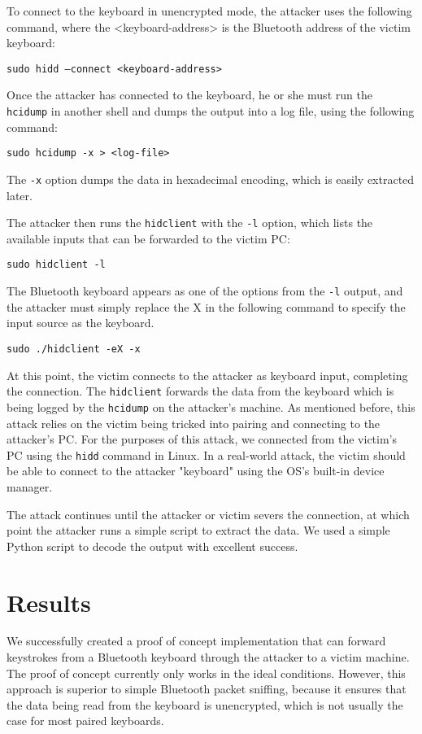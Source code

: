 \documentclass{acm_proc_article-sp}
\begin{document}
To connect to the keyboard in unencrypted mode, the attacker uses the following command, where the <keyboard-address> is the Bluetooth address of the victim keyboard:

\texttt{sudo hidd --connect <keyboard-address>}

Once the attacker has connected to the keyboard, he or she must run the \texttt{hcidump} in another shell and dumps the output into a log file, using the following command:

\texttt{sudo hcidump -x > <log-file>}

The \texttt{-x} option dumps the data in hexadecimal encoding, which is easily extracted later. 

The attacker then runs the \texttt{hidclient} with the \texttt{-l} option, which lists the available inputs that can be forwarded to the victim PC:

\texttt{sudo hidclient -l}

The Bluetooth keyboard appears as one of the options from the \texttt{-l} output, and the attacker must simply replace the X in the following command to specify the input source as the keyboard. 

\texttt{sudo ./hidclient -eX -x}

At this point, the victim connects to the attacker as keyboard input, completing the connection. The \texttt{hidclient} forwards the data from the keyboard which is being logged by the \texttt{hcidump} on the attacker's machine. As mentioned before, this attack relies on the victim being tricked into pairing and connecting to the attacker's PC. For the purposes of this attack, we connected from the victim's PC using the \texttt{hidd} command in Linux. In a real-world attack, the victim should be able to connect to the attacker "keyboard" using the OS's built-in device manager. 

The attack continues until the attacker or victim severs the connection, at which point the attacker runs a simple script to extract the data. We used a simple Python script to decode the output with excellent success.

\section{Results}
We successfully created a proof of concept implementation that can forward keystrokes from a Bluetooth keyboard through the attacker to a victim machine. The proof of concept currently only works in the ideal conditions. However, this approach is superior to simple Bluetooth packet sniffing, because it ensures that the data being read from the keyboard is unencrypted, which is not usually the case for most paired keyboards. 
\end{document}

